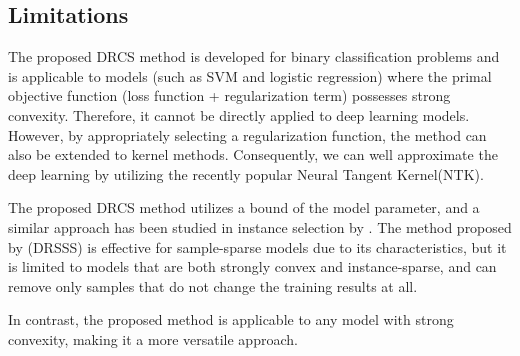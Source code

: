 \subsection{Limitations}
\label{subsec:limits}

The proposed DRCS method is developed for binary classification problems and is applicable to models (such as SVM and logistic regression) where the primal objective function (loss function + regularization term) possesses strong convexity. Therefore, it cannot be directly applied to deep learning models. However, by appropriately selecting a regularization function, the method can also be extended to kernel methods. Consequently, we can well approximate the deep learning by utilizing the recently popular Neural Tangent Kernel(NTK)\citep{neuraltangents2020}.

The proposed DRCS method utilizes a bound of the model parameter, and a similar approach has been studied in instance selection by \citet{10.1162/neco_a_01619}. The method proposed by \citet{10.1162/neco_a_01619} (DRSSS) is effective for sample-sparse models due to its characteristics, but it is limited to models that are both strongly convex and instance-sparse, and can remove only samples that do not change the training results at all.

In contrast, the proposed method is applicable to any model with strong convexity, making it a more versatile approach.